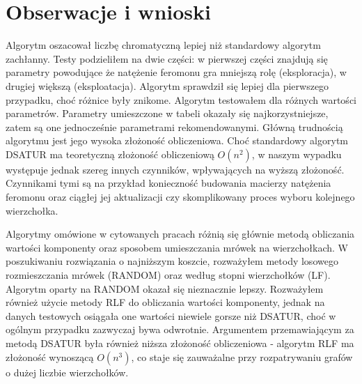 \documentclass[11pt]{article}
\begin{document}
\section{Obserwacje i wnioski}
Algorytm oszacował liczbę chromatyczną lepiej niż standardowy algorytm zachłanny.  Testy podzieliłem na dwie części: w pierwszej części znajdują się parametry powodujące że natężenie feromonu gra mniejszą rolę (eksploracja), w drugiej większą (eksploatacja). Algorytm sprawdził się lepiej dla pierwszego przypadku, choć różnice były znikome. Algorytm testowałem dla różnych wartości parametrów. Parametry umieszczone w tabeli okazały się najkorzystniejsze, zatem są one jednocześnie parametrami rekomendowanymi. Główną trudnością algorytmu jest jego wysoka złożoność obliczeniowa. Choć standardowy algorytm DSATUR ma teoretyczną złożoność obliczeniową $O(n^2)$, w naszym wypadku występuje jednak szereg innych czynników, wpływających na wyższą złożoność. Czynnikami tymi są na przykład konieczność budowania macierzy natężenia feromonu oraz ciągłej jej aktualizacji czy skomplikowany proces wyboru kolejnego wierzchołka.

Algorytmy omówione w cytowanych pracach\cite{ASLSCT, Bessedik, CH, SEH} różnią się głównie metodą obliczania wartości komponenty oraz sposobem umieszczania mrówek na wierzchołkach. W poszukiwaniu rozwiązania o najniższym koszcie, rozważyłem metody losowego rozmieszczania mrówek (RANDOM) oraz według stopni wierzchołków (LF). Algorytm oparty na RANDOM okazał się nieznacznie lepszy. Rozważyłem również użycie metody RLF do obliczania wartości komponenty, jednak na danych testowych osiągała one wartości niewiele gorsze niż DSATUR, choć w ogólnym przypadku zazwyczaj bywa odwrotnie. Argumentem przemawiającym za metodą DSATUR była również niższa złożoność obliczeniowa - algorytm RLF ma złożoność wynoszącą  $O(n^3)$\cite{LF}, co staje się zauważalne przy rozpatrywaniu grafów o dużej liczbie wierzchołków.



\newpage
{}

\end{document}

